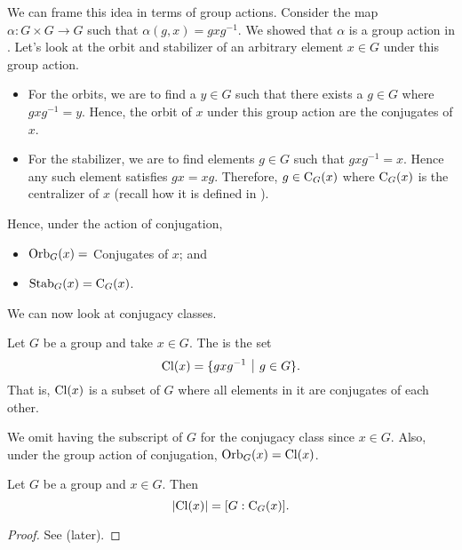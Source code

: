 We can frame this idea in terms of group actions. Consider the map $\alpha: G\times G\to G$ such that $\alpha(g, x) = gxg^{-1}$. We showed that $\alpha$ is a group action in . Let's look at the orbit and stabilizer of an arbitrary element $x \in G$ under this group action.
\begin{itemize}
    \item For the orbits, we are to find a $y \in G$ such that there exists a $g \in G$ where $gxg^{-1} = y$. Hence, the orbit of $x$ under this group action are the conjugates of $x$.
    \item For the stabilizer, we are to find elements $g \in G$ such that $gxg^{-1} = x$. Hence any such element satisfies $gx = xg$. Therefore, $g \in \mathrm{C}_{G}(x)$ where $\mathrm{C}_{G}(x)$ is the centralizer of $x$ (recall how it is defined in ).
\end{itemize}

Hence, under the action of conjugation,
\begin{itemize}
    \item $\mathrm{Orb}_{G}(x) = $ Conjugates of $x$; and
    \item $\mathrm{Stab}_{G}(x) = \mathrm{C}_{G}(x)$.
\end{itemize}

We can now look at conjugacy classes.
\begin{definition}
    Let $G$ be a group and take $x \in G$. The  is the set
    \[
        \Cl{x} = \{gxg^{-1} \vert g \in G\}.
    \]
    That is, $\mathrm{Cl}(x)$ is a subset of $G$ where all elements in it are conjugates of each other.
\end{definition}
\begin{remark}
    We omit having the subscript of $G$ for the conjugacy class since $x \in G$. Also, under the group action of conjugation, $\mathrm{Orb}_{G}(x) = \mathrm{Cl}(x)$.
\end{remark}

\begin{proposition}\label{prop-cardinality-of-conjugacy-class}
    Let $G$ be a group and $x \in G$. Then
    \[
        |\mathrm{Cl}(x)| = [G : \mathrm{C}_{G}(x)].
    \]
\end{proposition}
\begin{proof}
    See  (later).
\end{proof}

